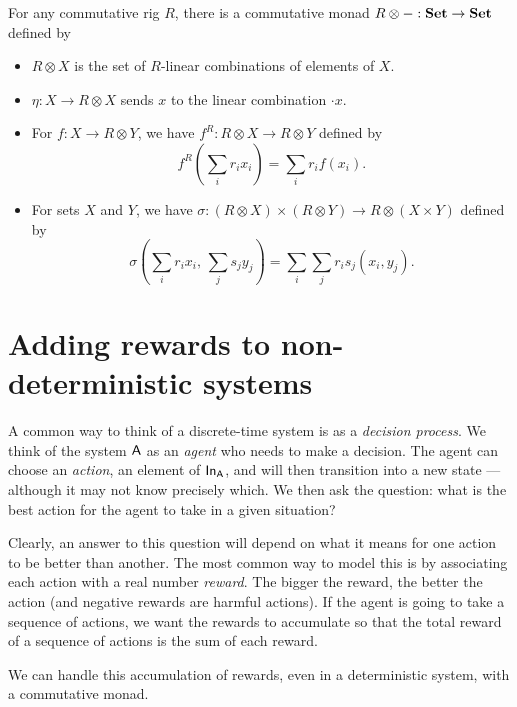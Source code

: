 \documentclass[DynamicalBook]{subfiles}
\begin{document}
\begin{proposition}
  For any commutative rig $R$, there is a commutative monad $R \otimes - :
  \textbf{Set} \to \textbf{Set}$ defined by
  \begin{itemize}
    \item $R \otimes X$ is the set of $R$-linear combinations of elements of
      $X$.
    \item $\eta : X \to R \otimes X$ sends $x$ to the linear combination $
      \cdot x$.
    \item For $f : X \to R \otimes Y$, we have $f^{R} : R \otimes X \to R
      \otimes Y$ defined by
      \[
f^R\left( \sum_{i}r_i x_i \right) = \sum_{i} r_i f(x_i).
\]
    \item For sets $X$ and $Y$, we have $\sigma : (R \otimes X) \times (R
      \otimes Y) \to R \otimes (X \times Y)$ defined by
      \[
\sigma\left( \sum_i r_i x_i,\, \sum_j s_j y_j \right) = \sum_{i}\sum_{j} r_i s_j
(x_i, y_j).
      \]
  \end{itemize}
\end{proposition}



\section{Adding rewards to non-deterministic systems}

A common way to think of a discrete-time system is as a \emph{decision process}. We
think of the system $\mathsf{A}$ as an \emph{agent} who needs to make a decision.
The agent can choose an \emph{action}, an element of $\mathsf{In}_{\mathsf{A}}$, and will then
transition into a new state --- although it may not know precisely which. We
then ask the question: what is the best action for the agent to take in a given
situation?

Clearly, an answer to this question will depend on what it means for one action
to be better than another. The most common way to model this is by associating
each action with a real number \emph{reward}. The bigger the reward, the better
the action (and negative rewards are harmful actions). If the agent is going to
take a sequence of actions, we want the rewards to accumulate so that the total
reward of a sequence of actions is the sum of each reward.

We can handle this accumulation of rewards, even in a deterministic system, with
a commutative monad.
\end{document}
